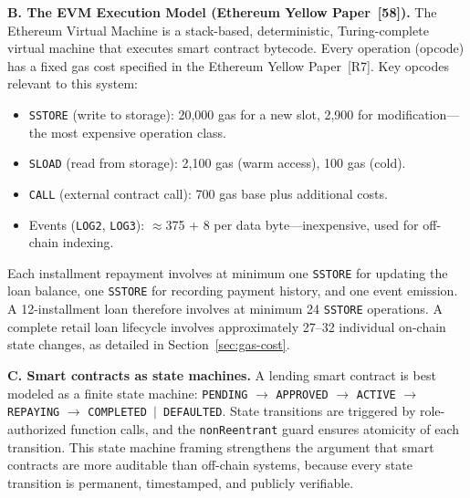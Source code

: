 \documentclass[12pt,a4paper]{report}
\begin{document}
\textbf{B. The EVM Execution Model (Ethereum Yellow Paper~[58]).}
The Ethereum Virtual Machine is a stack-based, deterministic, Turing-complete virtual machine that executes smart contract bytecode. Every operation (opcode) has a fixed gas cost specified in the Ethereum Yellow Paper~[R7]. Key opcodes relevant to this system:
\begin{itemize}[noitemsep]
  \item \texttt{SSTORE} (write to storage): 20,000 gas for a new slot, 2,900 for modification---the most expensive operation class.
  \item \texttt{SLOAD} (read from storage): 2,100 gas (warm access), 100 gas (cold).
  \item \texttt{CALL} (external contract call): 700 gas base plus additional costs.
  \item Events (\texttt{LOG2}, \texttt{LOG3}): $\approx$375 + 8 per data byte---inexpensive, used for off-chain indexing.
\end{itemize}
Each installment repayment involves at minimum one \texttt{SSTORE} for updating the loan balance, one \texttt{SSTORE} for recording payment history, and one event emission. A 12-installment loan therefore involves at minimum 24 \texttt{SSTORE} operations. A complete retail loan lifecycle involves approximately 27--32 individual on-chain state changes, as detailed in Section~\ref{sec:gas-cost}.

\textbf{C. Smart contracts as state machines.}
A lending smart contract is best modeled as a finite state machine: \texttt{PENDING} $\to$ \texttt{APPROVED} $\to$ \texttt{ACTIVE} $\to$ \texttt{REPAYING} $\to$ \texttt{COMPLETED $|$ DEFAULTED}. State transitions are triggered by role-authorized function calls, and the \texttt{nonReentrant} guard ensures atomicity of each transition. This state machine framing strengthens the argument that smart contracts are more auditable than off-chain systems, because every state transition is permanent, timestamped, and publicly verifiable.
\end{document}
